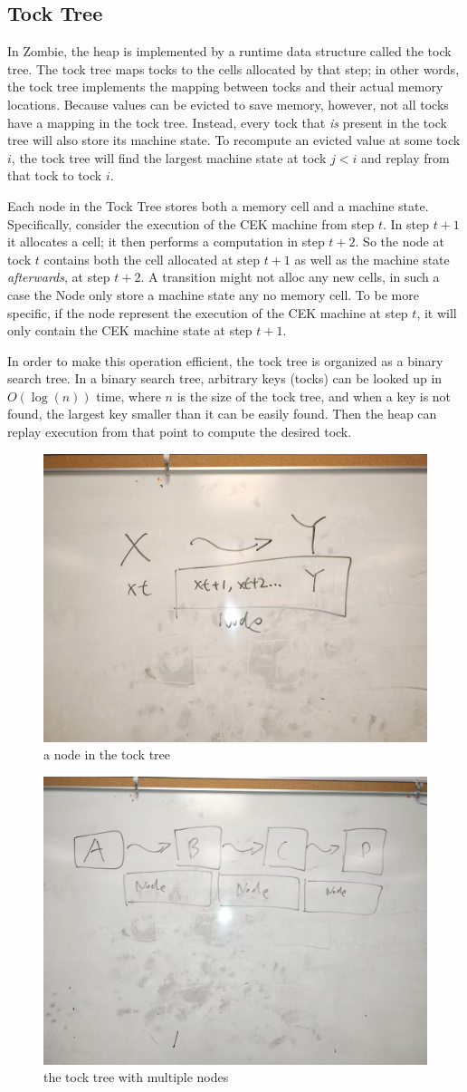 \subsection{Tock Tree}
In Zombie, the heap is implemented by a runtime data structure called the tock tree. The tock tree maps tocks to the cells allocated by that step; in other words, the tock tree implements the mapping between tocks and their actual memory locations. Because values can be evicted to save memory, however, not all tocks have a mapping in the tock tree. Instead, every tock that \emph{is} present in the tock tree will also store its machine state. To recompute an evicted value at some tock $i$, the tock tree will find the largest machine state at tock $j < i$ and replay from that tock to tock $i$.

Each node in the Tock Tree stores both a memory cell and a machine state. Specifically, consider the execution of the CEK machine from step $t$. In step $t + 1$ it allocates a cell; it then performs a computation in step $t + 2$. So the node at tock $t$ contains both the cell allocated at step $t + 1$ as well as the machine state \emph{afterwards}, at step $t + 2$. A transition might not alloc any new cells, in such a case the Node only store a machine state any no memory cell. To be more specific, if the node represent the execution of the CEK machine at step $t$, it will only contain the CEK machine state at step $t + 1$.

In order to make this operation efficient, the tock tree is organized as a binary search tree. In a binary search tree, arbitrary keys (tocks) can be looked up in $O(\log(n))$ time, where $n$ is the size of the tock tree, and when a key is not found, the largest key smaller than it can be easily found. Then the heap can replay execution from that point to compute the desired tock.

\begin{figure}
	\includegraphics[width=0.5\columnwidth]{2}
	\caption{a node in the tock tree}
\end{figure}
\begin{figure}
	\includegraphics[width=0.5\columnwidth]{3}
	\caption{the tock tree with multiple nodes}
\end{figure}

